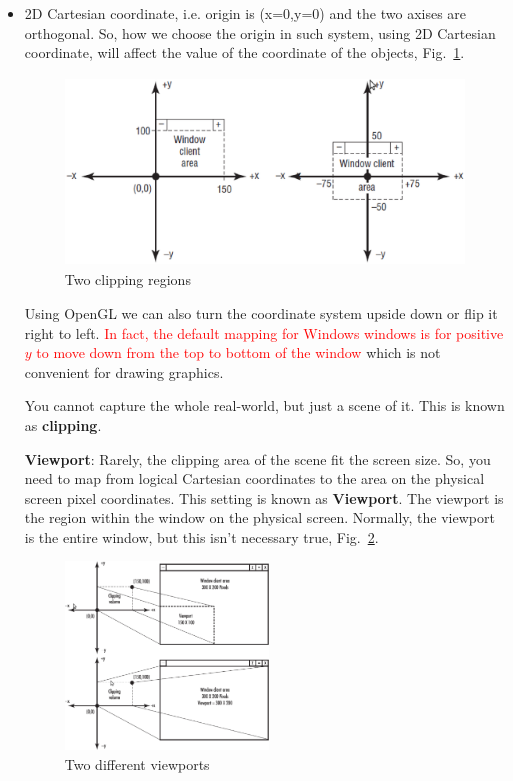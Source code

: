 \begin{itemize}
\item 2D Cartesian coordinate, i.e. origin is (x=0,y=0) and the two
  axises are orthogonal. So, how we choose the origin in such system,
  using 2D Cartesian coordinate, will affect the value of the
  coordinate of the objects, Fig.~\ref{fig:clipping}. 
\begin{figure}[hbt]
  \centerline{\includegraphics[height=5cm,
    angle=0]{./images/clipping.eps}}
\caption{Two clipping regions}
\label{fig:clipping}
\end{figure}

Using OpenGL we can also turn the coordinate system upside down or
flip it right to left.
\textcolor{red}{In fact, the default mapping for Windows windows is
  for positive $y$ to move down from the top to bottom of the
  window} which is not convenient for drawing graphics. 

You cannot capture the whole real-world, but just a scene of it. This
is known as {\bf clipping}. 

{\bf Viewport}: Rarely, the clipping area of the scene fit the screen
size. So, you need to map from logical Cartesian coordinates to the
area on the physical screen pixel coordinates. This setting is known
as {\bf Viewport}. The viewport is the region within the window on the
physical screen. Normally, the viewport is the entire window, but this
isn't necessary true, Fig.~\ref{fig:viewport}.

\begin{figure}[hbt]
  \centerline{\includegraphics[height=5cm,
    angle=0]{./images/viewport.eps}}
\caption{Two different viewports}
\label{fig:viewport}
\end{figure}


\end{itemize}
